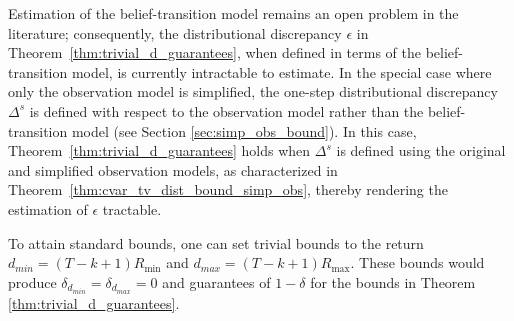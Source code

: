 \documentclass[acmlarge, manuscript, screen, review, natbib=false, oneside]{acmart}
\begin{document}
Estimation of the belief-transition model remains an open problem in the literature; consequently, the distributional discrepancy $\epsilon$ in Theorem~\ref{thm:trivial_d_guarantees}, when defined in terms of the belief-transition model, is currently intractable to estimate. In the special case where only the observation model is simplified, the one-step distributional discrepancy $\Delta^s$ is defined with respect to the observation model rather than the belief-transition model (see Section \ref{sec:simp_obs_bound}). In this case, Theorem~\ref{thm:trivial_d_guarantees} holds when $\Delta^s$ is defined using the original and simplified observation models, as characterized in Theorem~\ref{thm:cvar_tv_dist_bound_simp_obs}, thereby rendering the estimation of $\epsilon$ tractable.

To attain standard bounds, one can set trivial bounds to the return $d_{min}=(T-k+1)R_{\min}$ and $d_{max}=(T-k+1)R_{\max}$. These bounds would produce $\delta_{d_{min}}=\delta_{d_{max}}=0$ and guarantees of $1-\delta$ for the bounds in Theorem \ref{thm:trivial_d_guarantees}.
\end{document}
